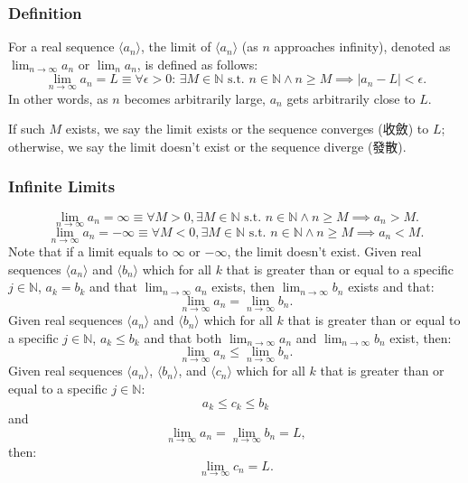 \documentclass[a4paper,12pt]{report}
\begin{document}
\subsubsection{Definition}
For a real sequence \(\langle a_n\rangle\), the limit of \(\langle a_n\rangle\) (as $n$ approaches infinity), denoted as $\lim_{n \to \infty} a_n$ or $\lim_n a_n$, is defined as follows:
\[\lim_{n \to \infty} a_n = L \equiv \forall \epsilon > 0:\, \exists M \in\mathbb{N}\text{\ s.t.\ } n\in\mathbb{N}\land n \geq M\implies |a_n - L| < \epsilon.\]
In other words, as \(n\) becomes arbitrarily large, \(a_n\) gets arbitrarily close to \(L\).

If such $M$ exists, we say the limit exists or the sequence converges (收斂) to $L$; otherwise, we say the limit doesn't exist or the sequence diverge (發散).
\subsubsection{Infinite Limits}
\[\lim_{n\to \infty}a_n=\infty \equiv \forall M > 0, \exists M \in\mathbb{N} \text{\ s.t.\ } n\in\mathbb{N}\land n \geq M \implies a_n > M.\]
\[\lim_{n\to \infty}a_n=-\infty \equiv \forall M < 0, \exists M \in\mathbb{N} \text{\ s.t.\ } n\in\mathbb{N}\land n \geq M \implies a_n < M.\]
Note that if a limit equals to $\infty$ or $-\infty$, the limit doesn't exist.
Given real sequences $\langle a_n\rangle$ and $\langle b_n\rangle$ which for all $k$ that is greater than or equal to a specific $j\in \mathbb{N}$, $a_k=b_k$ and that $\lim_{n\to\infty}a_n$ exists, then $\lim_{n\to\infty}b_n$ exists and that:
\[\lim_{n\to\infty}a_n=\lim_{n\to\infty}b_n.\]
Given real sequences $\langle a_n\rangle$ and $\langle b_n\rangle$ which for all $k$ that is greater than or equal to a specific $j\in \mathbb{N}$, $a_k\leq b_k$ and that both $\lim_{n\to\infty}a_n$ and $\lim_{n\to\infty}b_n$ exist, then:
\[\lim_{n\to\infty}a_n\leq\lim_{n\to\infty}b_n.\]
Given real sequences $\langle a_n\rangle$, $\langle b_n\rangle$, and $\langle c_n\rangle$ which for all $k$ that is greater than or equal to a specific $j\in \mathbb{N}$:
\[a_k\leq c_k\leq b_k\]
and
\[\lim_{n\to\infty}a_n=\lim_{n\to\infty}b_n=L,\]
then: 
\[\lim_{n\to\infty}c_n=L.\]
\end{document}
